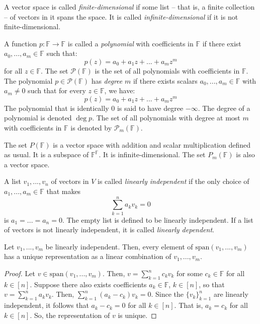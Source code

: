 \documentclass{article}
\begin{document}
\begin{definition}
  A vector space is called \textit{finite-dimensional} if some list --
  that is, a finite collection -- of vectors in it spans the space. It
  is called \textit{infinite-dimensional} if it is not finite-dimensional.
\end{definition}

\begin{definition}
  A function $p: \mathbb{F} \rightarrow \mathbb{F}$ is called a
  \textit{polynomial} with coefficients in $\mathbb{F}$ if there
  exist $a_0, ..., a_m \in \mathbb{F}$ such that:
  $$p(z) = a_0 + a_1 z + ... + a_m z^m$$
  for all $z \in \mathbb{F}$. The set $\mathcal{P}(\mathbb{F})$ is the
  set of all polynomials with coefficients in $\mathbb{F}$. The
  polynomial $p \in \mathcal{P}(\mathbb{F})$ has \textit{degree} $m$ if there
  exists scalars $a_0, ..., a_m \in \mathbb{F}$ with $a_m \ne 0$ such
  that for every $z \in \mathbb{F}$, we have:
  $$p(z) = a_0 + a_1z + ... + a_m z^m$$
  The polynomial that is identically $0$ is said to have degree
  $-\infty$. The degree of a polynomial is denoted $\deg p$. The set
  of all polynomials with degree at most $m$ with coefficients in $\mathbb{F}$
  is denoted by $\mathcal{P}_m(\mathbb{F})$.
\end{definition}

\begin{remark}
  The set $P(\mathbb{F})$ is a vector space with addition and scalar
  multiplication defined as usual. It is a subspace of
  $\mathbb{F}^{\mathbb{F}}$. It is infinite-dimensional. The set
  $P_m(\mathbb{F})$ is also a vector space.
\end{remark}

\begin{definition}
  A list $v_1, ..., v_n$ of vectors in $V$ is called \textit{linearly
    independent} if the only choice of $a_1,...,a_m \in \mathbb{F}$
  that makes
  $$\sum_{k=1}^n a_k v_k = 0$$
  is $a_1 = ... = a_n = 0$. The empty list is defined to be linearly
  independent. If a list of vectors is not linearly independent, it is
  called \textit{linearly dependent}.
\end{definition}

\begin{theorem}
  \label{thm:linear-independent-unique}
  Let $v_1, ..., v_m$ be linearly independent. Then, every element of
  $\text{span}(v_1, ..., v_m)$ has a unique representation as a linear
  combination of $v_1, ..., v_m$.
\end{theorem}
\begin{proof}
  Let $v \in \text{span}(v_1, ..., v_m)$. Then, $v = \sum_{k=1}^n c_k
  v_k$ for some $c_k \in \mathbb{F}$ for all $k \in [n]$. Suppose
  there also exists coefficients $a_k \in \mathbb{F}$, $k \in [n]$, so
  that $v = \sum_{k=1}^n a_k v_k$. Then, $\sum_{k=1}^n (a_k - c_k) v_k
  = 0$. Since the $\{v_k\}_{k=1}^n$ are linearly independent, it
  follows that $a_k - c_k = 0$ for all $k \in [n]$. That is, $a_k =
  c_k$ for all $k \in [n]$. So, the representation of $v$ is unique.
\end{proof}
\end{document}
